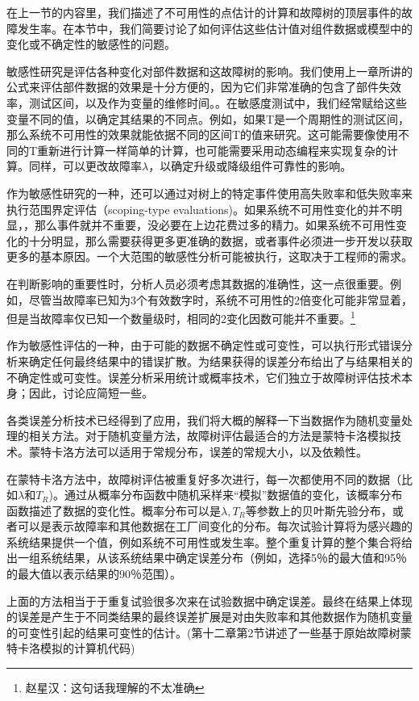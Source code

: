 \documentclass[cn,11pt,chinese]{elegantbook}
\begin{document}
{在上一节的内容里，我们描述了不可用性的点估计的计算和故障树的顶层事件的故障发生率。在本节中，我们简要讨论了如何评估这些估计值对组件数据或模型中的变化或不确定性的敏感性的问题。

敏感性研究是评估各种变化对部件数据和这故障树的影响。我们使用上一章所讲的公式来评估部件数据的效果是十分方便的，因为它们非常准确的包含了部件失效率，测试区间，以及作为变量的维修时间。。在敏感度测试中，我们经常赋给这些变量不同的值，以确定其结果的不同点。例如，如果T是一个周期性的测试区间，那么系统不可用性的效果就能依据不同的区间T的值来研究。这可能需要像使用不同的T重新进行计算一样简单的计算，也可能需要采用动态编程来实现复杂的计算。同样，可以更改故障率$\lambda$，以确定升级或降级组件可靠性的影响。

作为敏感性研究的一种，还可以通过对树上的特定事件使用高失败率和低失败率来执行范围界定评估（scoping-type evaluations)。如果系统不可用性变化的并不明显，，那么事件就并不重要，没必要在上边花费过多的精力。如果系统不可用性变化的十分明显，那么需要获得更多更准确的数据，或者事件必须进一步开发以获取更多的基本原因。一个大范围的敏感性分析可能被执行，这取决于工程师的需求。

在判断影响的重要性时，分析人员必须考虑其数据的准确性，这一点很重要。例如，尽管当故障率已知为3个有效数字时，系统不可用性的2倍变化可能非常显着，但是当故障率仅已知一个数量级时，相同的2变化因数可能并不重要。\footnote{赵星汉：这句话我理解的不太准确}

作为敏感性评估的一种，由于可能的数据不确定性或可变性，可以执行形式错误分析来确定任何最终结果中的错误扩散。为结果获得的误差分布给出了与结果相关的不确定性或可变性。误差分析采用统计或概率技术，它们独立于故障树评估技术本身；因此，讨论应简短一些。

各类误差分析技术已经得到了应用，我们将大概的解释一下当数据作为随机变量处理的相关方法。对于随机变量方法，故障树评估最适合的方法是蒙特卡洛模拟技术。蒙特卡洛方法可以适用于常规分布，误差的常规大小，以及依赖性。

在蒙特卡洛方法中，故障树评估被重复好多次进行，每一次都使用不同的数据（比如$\lambda$和$T_R$)。通过从概率分布函数中随机采样来“模拟”数据值的变化，该概率分布函数描述了数据的变化性。概率分布可以是$\lambda,T_R$等参数上的贝叶斯先验分布，或者可以是表示故障率和其他数据在工厂间变化的分布。每次试验计算将为感兴趣的系统结果提供一个值，例如系统不可用性或发生率。整个重复计算的整个集合将给出一组系统结果，从该系统结果中确定误差分布（例如，选择5％的最大值和95％的最大值以表示结果的90％范围）。

上面的方法相当于于重复试验很多次来在试验数据中确定误差。最终在结果上体现的误差是产生于不同类结果的最终误差扩展是对由失败率和其他数据作为随机变量的可变性引起的结果可变性的估计。(第十二章第2节讲述了一些基于原始故障树蒙特卡洛模拟的计算机代码)

}
\end{document}
